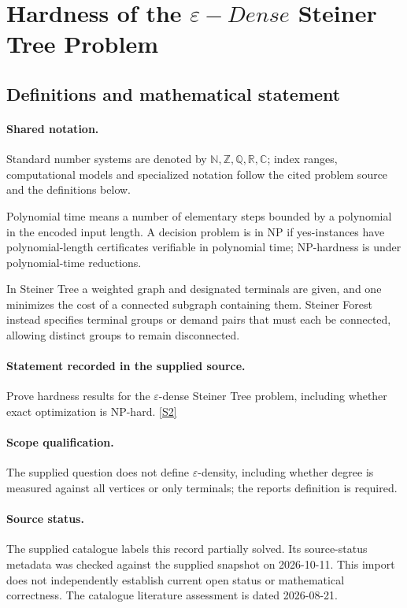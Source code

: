\documentclass[11pt]{article}
\newcommand{\sref}[2]{\hyperlink{source:#1:#2}{[S#2]}}
\begin{document}
\section{Hardness of the $\varepsilon-Dense$ Steiner Tree Problem}\label{statement}

\subsection{Definitions and mathematical statement}

\paragraph{Shared notation.}Standard number systems are denoted by $\mathbb N,\mathbb Z,\mathbb Q,\mathbb R,\mathbb C$; index ranges, computational models and specialized notation follow the cited problem source and the definitions below.


Polynomial time means a number of elementary steps bounded by a polynomial in the encoded input length. A decision problem is in $\mathrm{NP}$ if yes-instances have polynomial-length certificates verifiable in polynomial time; NP-hardness is under polynomial-time reductions.

In Steiner Tree a weighted graph and designated terminals are given, and one minimizes the cost of a connected subgraph containing them. Steiner Forest instead specifies terminal groups or demand pairs that must each be connected, allowing distinct groups to remain disconnected.
\paragraph{Statement recorded in the supplied source.}
Prove hardness results for the $\varepsilon$-dense Steiner Tree problem, including whether exact optimization is NP-hard. \sref{statement}{2}
\paragraph{Scope qualification.}
The supplied question does not define $\varepsilon$-density, including whether degree is measured against all vertices or only terminals; the report\textquotesingle s definition is required.
\paragraph{Source status.}
The supplied catalogue labels this record partially solved. Its source-status metadata was checked against the supplied snapshot on 2026-10-11. This import does not independently establish current open status or mathematical correctness. The catalogue literature assessment is dated 2026-08-21.
\end{document}
